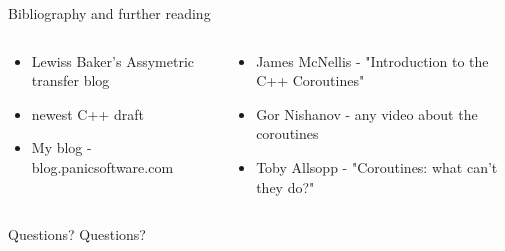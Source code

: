 \documentclass[10pt]{beamer}
\begin{document}
\begin{frame}{Bibliography and further reading}
\begin{columns}
\begin{column}{0.48\linewidth}
	\begin{itemize}
		\item Lewiss Baker's Assymetric transfer blog
		\item newest C++ draft
		\item My blog - blog.panicsoftware.com
	\end{itemize}
\end{column}
\begin{column}{0.48\linewidth}
	\begin{itemize}
		\item James McNellis - "Introduction to the C++ Coroutines"
		\item Gor Nishanov - any video about the coroutines
		\item Toby Allsopp - "Coroutines: what can't they do?"
	\end{itemize}
\end{column}

\end{columns}
\end{frame}

\begin{frame}{Questions?}
\vfill
\centering Questions?
\vfill
\end{frame}
\end{document}
